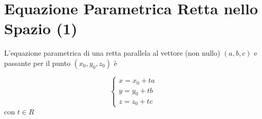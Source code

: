 \section{Equazione Parametrica Retta nello Spazio (1)}
\begin{definizione}
L'equazione parametrica di una retta parallela al vettore (non nullo) $(a,b,c)$ e passante per il punto $(x_0,y_0,z_0)$ \`e

 \begin{equation}
   \begin{cases}
   x=x_0 + ta \\
   y=y_0 + tb \\
   z=z_0 + tc
   \end{cases}
\end{equation}
con $t \in R$

\end{definizione}





